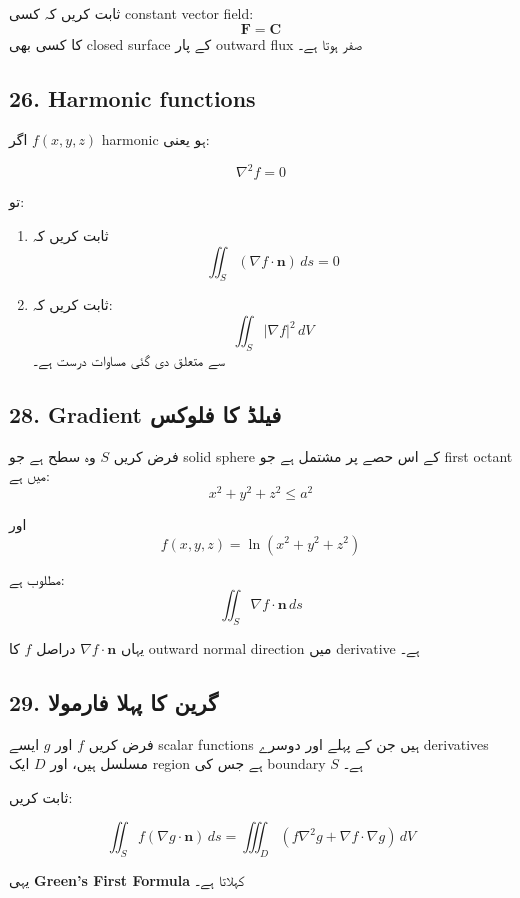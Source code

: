 \begin{enumerate}
ثابت کریں کہ کسی constant vector field:
\[
\mathbf{F} = \mathbf{C}
\]
کا کسی بھی closed surface کے پار outward flux صفر ہوتا ہے۔

\bigskip

\subsection*{26. Harmonic functions}

اگر \( f(x,y,z) \) harmonic ہو یعنی:

\[
\nabla^2 f = 0
\]

تو:

\begin{enumerate}
\item[a.]
ثابت کریں کہ
\[
\iint_S (\nabla f \cdot \mathbf{n})\, ds = 0
\]

\item[b.]
ثابت کریں کہ:
\[
\iint_S |\nabla f|^2\, dV
\]
سے متعلق دی گئی مساوات درست ہے۔
\end{enumerate}


\subsection*{28. Gradient فیلڈ کا فلوکس}

فرض کریں \( S \) وہ سطح ہے جو solid sphere کے اس حصے پر مشتمل ہے جو first octant میں ہے:
\[
x^2 + y^2 + z^2 \le a^2
\]

اور
\[
f(x,y,z) = \ln(x^2 + y^2 + z^2)
\]

مطلوب ہے:
\[
\iint_S \nabla f \cdot \mathbf{n}\, ds
\]

یہاں \( \nabla f \cdot \mathbf{n} \) دراصل \( f \) کا outward normal direction میں derivative ہے۔

\bigskip

\subsection*{29. گرین کا پہلا فارمولا}

فرض کریں \( f \) اور \( g \) ایسے scalar functions ہیں جن کے پہلے اور دوسرے derivatives مسلسل ہیں، اور \( D \) ایک region ہے جس کی boundary \( S \) ہے۔

ثابت کریں:

\[
\iint_S f(\nabla g \cdot \mathbf{n})\, ds
=
\iiint_D \left(f\nabla^2 g + \nabla f \cdot \nabla g\right)\, dV
\]

یہی \textbf{Green’s First Formula} کہلاتا ہے۔


\end{enumerate}
